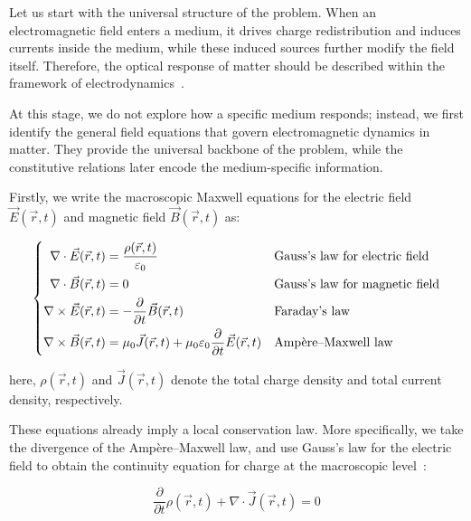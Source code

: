 Let us start with the universal structure of the problem.
When an electromagnetic field enters a medium, it drives charge redistribution and induces currents inside the medium, while these induced sources further modify the field itself.
Therefore, the optical response of matter should be described within the framework of electrodynamics~\cite{landau2013electrodynamics,griffiths2023introduction}.

At this stage, we do not explore how a specific medium responds;
instead, we first identify the general field equations that govern electromagnetic dynamics in matter.
They provide the universal backbone of the problem, while the constitutive relations later encode the medium-specific information.

Firstly, we write the macroscopic Maxwell equations for the electric field $\vec{E}(\vec{r},t)$ and magnetic field $\vec{B}(\vec{r},t)$ as:

\begin{equation}
\left\{\begin{aligned}
    \nabla\cdot\vec{E}(\vec{r},t) &= \frac{\rho(\vec{r},t)}{\varepsilon_0} 
    &&\space \text{Gauss's law for electric field} \\
    \nabla\cdot\vec{B}(\vec{r},t) &= 0 
    &&\space \text{Gauss's law for magnetic field} \\
    \nabla\times\vec{E}(\vec{r},t) &= -\frac{\partial}{\partial t}\vec{B}(\vec{r},t) 
    &&\space \text{Faraday's law} \\
    \nabla\times\vec{B}(\vec{r},t) &= \mu_0\vec{J}(\vec{r},t)+\mu_0\varepsilon_0\frac{\partial}{\partial t}\vec{E}(\vec{r},t)
    &&\space \text{Ampère--Maxwell law}
\end{aligned}\right.
\label{maxwell_equations_with_total_sources}
\end{equation}

here, $\rho(\vec{r},t)$ and $\vec{J}(\vec{r},t)$ denote the total charge density and total current density, respectively.

These equations already imply a local conservation law.
More specifically, we take the divergence of the Ampère--Maxwell law,
and use Gauss's law for the electric field to obtain the continuity equation for charge at the macroscopic level~\cite{landau2013electrodynamics}:

\begin{equation}
    \frac{\partial}{\partial t}\rho(\vec{r},t)+\nabla\cdot\vec{J}(\vec{r},t)=0
\label{macroscopic_charge_continuity_equation}
\end{equation}

